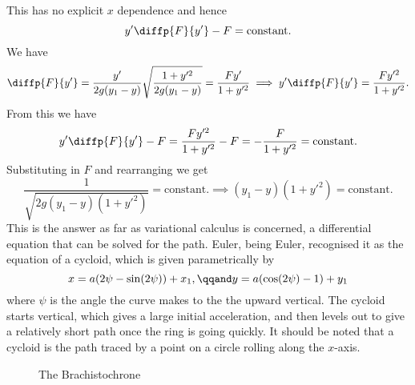 \documentclass[fleqn]{NotesClass}
\begin{document}
    This has no explicit \(x\) dependence and hence
    \begin{equation}
        y'\diffp{F}{y'} - F = \text{constant.}
    \end{equation}
    We have
    \begin{equation}
        \diffp{F}{y'} = \frac{y'}{2g(y_1 - y)}\sqrt{\frac{1 + y'^2}{2g(y_1 - y)}} = \frac{Fy'}{1 + y'^2} \implies y'\diffp{F}{y'} = \frac{Fy'^2}{1 + y'^2}.
    \end{equation}
    From this we have
    \begin{equation}
        y'\diffp{F}{y'} - F = \frac{Fy'^2}{1 + y'^2} - F = -\frac{F}{1 + y'^2} = \text{constant.}
    \end{equation}
    Substituting in \(F\) and rearranging we get
    \begin{equation}
        \frac{1}{\sqrt{2g(y_1 - y)(1 + y'^2)}} = \text{constant.} \implies (y_1 - y)(1 + y'^2) = \text{constant.}
    \end{equation}
    This is the answer as far as variational calculus is concerned, a differential equation that can be solved for the path.
    Euler, being Euler, recognised it as the equation of a cycloid, which is given parametrically by
    \begin{equation}
        x = a(2\psi - \sin(2\psi)) + x_1, \qqand y = a(\cos(2\psi) - 1) + y_1
    \end{equation}
    where \(\psi\) is the angle the curve makes to the the upward vertical.
    The cycloid starts vertical, which gives a large initial acceleration, and then levels out to give a relatively short path once the ring is going quickly.
    It should be noted that a cycloid is the path traced by a point on a circle rolling along the \(x\)-axis.
    
    \begin{figure}
        \caption{The Brachistochrone}
    \end{figure}
    
\end{document}

